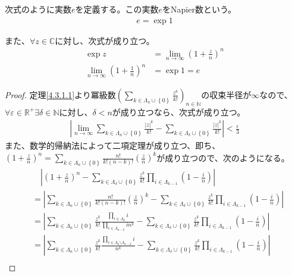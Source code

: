 \documentclass[dvipdfmx]{jsarticle}
\begin{document}
\begin{dfn}
次式のように実数$e$を定義する。この実数$e$をNapier数という。
\begin{align*}
e = \exp 1
\end{align*}
\end{dfn}
\begin{thm}\label{4.3.1.3} また、$\forall z \in \mathbb{C}$に対し、次式が成り立つ。
\begin{align*}
\exp z &= \lim_{n \rightarrow \infty}\left( 1 + \frac{z}{n} \right)^{n}\\
\lim_{n \rightarrow \infty}\left( 1 + \frac{1}{n} \right)^{n} &= \exp 1 = e
\end{align*}
\end{thm}
\begin{proof} 定理\ref{4.3.1.1}より冪級数$\left( \sum_{k \in \varLambda_{n} \cup \left\{ 0 \right\}} \frac{z^{k}}{k!} \right)_{n \in \mathbb{N}}$の収束半径が$\infty$なので、$\forall\varepsilon \in \mathbb{R}^{+}\exists\delta \in \mathbb{N}$に対し、$\delta < n$が成り立つなら、次式が成り立つ。
\begin{align*}
\left| \lim_{n \rightarrow \infty}{\sum_{k \in \varLambda_{n} \cup \left\{ 0 \right\}} \frac{|z|^{k}}{k!}} - \sum_{k \in \varLambda_{\delta} \cup \left\{ 0 \right\}} \frac{|z|^{k}}{k!} \right| < \frac{\varepsilon}{3}
\end{align*}
また、数学的帰納法によって二項定理が成り立つ、即ち、$\left( 1 + \frac{z}{n} \right)^{n} = \sum_{k \in \varLambda_{n} \cup \left\{ 0 \right\}} {\frac{n!}{k!(n - k)!}\left( \frac{z}{n} \right)^{k}}$が成り立つので、次のようになる。
\begin{align*}
&\quad \left| \left( 1 + \frac{z}{n} \right)^{n} - \sum_{k \in \varLambda_{\delta} \cup \left\{ 0 \right\}} {\frac{z^{k}}{k!}\prod_{i \in \varLambda_{k - 1}} \left( 1 - \frac{i}{n} \right)} \right| \\
&= \left| \sum_{k \in \varLambda_{n} \cup \left\{ 0 \right\}} {\frac{n!}{k!(n - k)!}\left( \frac{z}{n} \right)^{k}} - \sum_{k \in \varLambda_{\delta} \cup \left\{ 0 \right\}} {\frac{z^{k}}{k!}\prod_{i \in \varLambda_{k - 1}} \left( 1 - \frac{i}{n} \right)} \right|\\
&= \left| \sum_{k \in \varLambda_{n} \cup \left\{ 0 \right\}} {\frac{z^{k}}{k!}\frac{\prod_{i \in \varLambda_{k}} i}{\prod_{i \in \varLambda_{n - k}} in^{k}}} - \sum_{k \in \varLambda_{\delta} \cup \left\{ 0 \right\}} {\frac{z^{k}}{k!}\prod_{i \in \varLambda_{k - 1}} \left( 1 - \frac{i}{n} \right)} \right|\\
&= \left| \sum_{k \in \varLambda_{n} \cup \left\{ 0 \right\}} {\frac{z^{k}}{k!}\frac{\prod_{i \in \varLambda_{k} \setminus \varLambda_{n - k}} i}{n^{k}}} - \sum_{k \in \varLambda_{\delta} \cup \left\{ 0 \right\}} {\frac{z^{k}}{k!}\prod_{i \in \varLambda_{k - 1}} \left( 1 - \frac{i}{n} \right)} \right|\\

\end{align*}
\end{proof}
\end{document}
